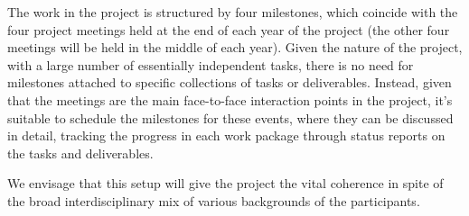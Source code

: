 
The work in the \TheProject project is structured by four milestones,
which coincide with the four project meetings held at the end of each
year of the project (the other four meetings will be held in the middle
of each year). Given the nature of the project, with a
large number of essentially independent tasks, there is no need for
milestones attached to specific collections of tasks or
deliverables. Instead, given that the meetings are the main
face-to-face interaction points in the project, it's suitable to
schedule the milestones for these events, where they can be discussed
in detail, tracking the progress in each work package through status
reports on the tasks and deliverables.

We envisage that this setup will give the project the vital coherence
in spite of the broad interdisciplinary mix of various backgrounds of the
participants.




